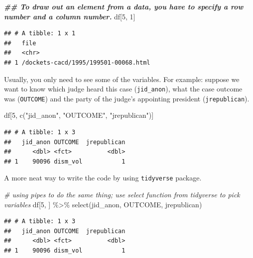 \documentclass[
]{article}
\newenvironment{Shaded}{\begin{snugshade}}{\end{snugshade}}
\newcommand{\CommentTok}[1]{\textcolor[rgb]{0.56,0.35,0.01}{\textit{#1}}}
\newcommand{\DecValTok}[1]{\textcolor[rgb]{0.00,0.00,0.81}{#1}}
\newcommand{\DocumentationTok}[1]{\textcolor[rgb]{0.56,0.35,0.01}{\textbf{\textit{#1}}}}
\newcommand{\FunctionTok}[1]{\textcolor[rgb]{0.00,0.00,0.00}{#1}}
\newcommand{\NormalTok}[1]{#1}
\newcommand{\SpecialCharTok}[1]{\textcolor[rgb]{0.00,0.00,0.00}{#1}}
\newcommand{\StringTok}[1]{\textcolor[rgb]{0.31,0.60,0.02}{#1}}
\begin{document}
\begin{Shaded}
\begin{Highlighting}[]
\DocumentationTok{\#\# To draw out an element from a data, you have to specify a row number and a column number.}
\NormalTok{df[}\DecValTok{5}\NormalTok{, }\DecValTok{1}\NormalTok{]}
\end{Highlighting}
\end{Shaded}

\begin{verbatim}
## # A tibble: 1 x 1
##   file                                
##   <chr>                               
## 1 /dockets-cacd/1995/199501-00068.html
\end{verbatim}

Usually, you only need to see some of the variables. For example:
suppose we want to know which judge heard this case
(\texttt{jid\_anon}), what the case outcome was (\texttt{OUTCOME}) and
the party of the judge's appointing president (\texttt{jrepublican}).

\begin{Shaded}
\begin{Highlighting}[]
\NormalTok{df[}\DecValTok{5}\NormalTok{, }\FunctionTok{c}\NormalTok{(}\StringTok{"jid\_anon"}\NormalTok{, }\StringTok{"OUTCOME"}\NormalTok{, }\StringTok{"jrepublican"}\NormalTok{)]}
\end{Highlighting}
\end{Shaded}

\begin{verbatim}
## # A tibble: 1 x 3
##   jid_anon OUTCOME  jrepublican
##      <dbl> <fct>          <dbl>
## 1    90096 dism_vol           1
\end{verbatim}

A more neat way to write the code by using \texttt{tidyverse} package.

\begin{Shaded}
\begin{Highlighting}[]
\CommentTok{\# using pipes to do the same thing; use select function from tidyverse to pick variables }
\NormalTok{df[}\DecValTok{5}\NormalTok{, ] }\SpecialCharTok{\%\textgreater{}\%} \FunctionTok{select}\NormalTok{(jid\_anon, OUTCOME, jrepublican)}
\end{Highlighting}
\end{Shaded}

\begin{verbatim}
## # A tibble: 1 x 3
##   jid_anon OUTCOME  jrepublican
##      <dbl> <fct>          <dbl>
## 1    90096 dism_vol           1
\end{verbatim}
\end{document}

